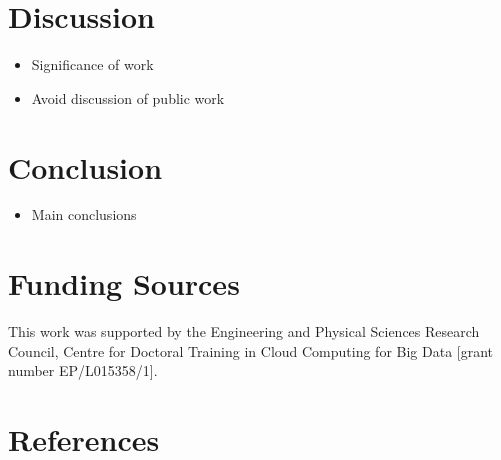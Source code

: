 \documentclass[final,3p,times,twocolumn,numbers]{elsarticle}
\begin{document}
\section{Discussion}
\label{sec:discussion}

\begin{itemize}
	\item Significance of work
	\item Avoid discussion of public work
\end{itemize}

\section{Conclusion}
\label{sec:conclusion}

\begin{itemize}
	\item Main conclusions
\end{itemize}

\section{Funding Sources}

This work was supported by the Engineering and Physical Sciences Research Council, Centre for Doctoral Training in Cloud Computing for Big Data [grant number EP/L015358/1].






   
  \section*{References}
  


%
%
%
\end{document}
